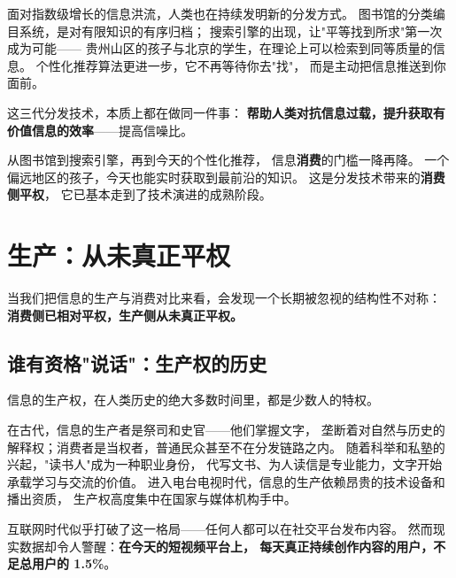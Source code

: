 \documentclass[12pt, a4paper, openany]{book}
\newcommand{\key}[1]{\textbf{\color{AccentBlue}#1}}
\newcommand{\data}[1]{\textbf{#1}}
\begin{document}
\vspace{6pt}

面对指数级增长的信息洪流，人类也在持续发明新的分发方式。
图书馆的分类编目系统，是对有限知识的有序归档；
搜索引擎的出现，让"平等找到所求"第一次成为可能——
贵州山区的孩子与北京的学生，在理论上可以检索到同等质量的信息。
个性化推荐算法更进一步，它不再等待你去"找"，
而是主动把信息推送到你面前。

这三代分发技术，本质上都在做同一件事：
\key{帮助人类对抗信息过载，提升获取有价值信息的效率}——提高信噪比。

\begin{coreview}
从图书馆到搜索引擎，再到今天的个性化推荐，
信息\textbf{消费}的门槛一降再降。
一个偏远地区的孩子，今天也能实时获取到最前沿的知识。
这是分发技术带来的\textbf{消费侧平权}，
它已基本走到了技术演进的成熟阶段。
\end{coreview}

\section{生产：从未真正平权}

当我们把信息的生产与消费对比来看，会发现一个长期被忽视的结构性不对称：
\key{消费侧已相对平权，生产侧从未真正平权。}

\subsection{谁有资格"说话"：生产权的历史}

信息的生产权，在人类历史的绝大多数时间里，都是少数人的特权。

在古代，信息的生产者是祭司和史官——他们掌握文字，
垄断着对自然与历史的解释权；消费者是当权者，普通民众甚至不在分发链路之内。
随着科举和私塾的兴起，"读书人"成为一种职业身份，
代写文书、为人读信是专业能力，文字开始承载学习与交流的价值。
进入电台电视时代，信息的生产依赖昂贵的技术设备和播出资质，
生产权高度集中在国家与媒体机构手中。

互联网时代似乎打破了这一格局——任何人都可以在社交平台发布内容。
然而现实数据却令人警醒：\data{在今天的短视频平台上，
每天真正持续创作内容的用户，不足总用户的 1.5\%}。

\vspace{14pt}
\end{document}
